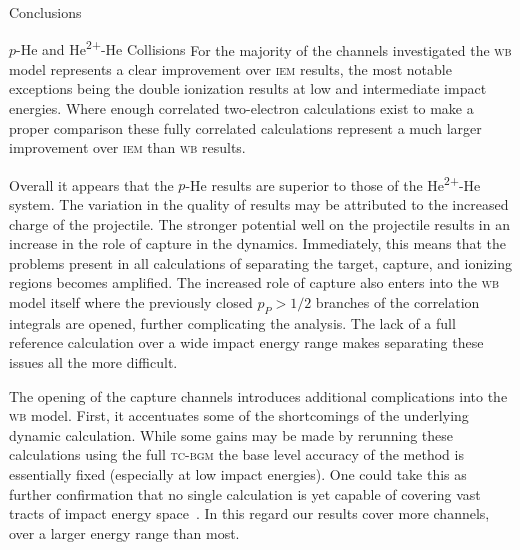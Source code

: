 \documentclass[a5paper, 9 pt]{extreport}
\begin{document}
\begin{chapter}{Conclusions \label{chap:con}}
\begin{section}{\texorpdfstring{$p$}{p}-He and \texorpdfstring{He\textsuperscript{2+}}{He2+}-He
                   Collisions \label{sec:con-phe2p-he}}
      For the majority of the channels investigated the \textsc{wb} model represents a clear improvement
      over \textsc{iem}  results, the most notable exceptions being the double ionization results at low
      and intermediate impact energies. Where enough correlated two-electron calculations exist to make
      a proper comparison these fully correlated calculations represent a much larger improvement over
      \textsc{iem} than \textsc{wb} results.

      Overall it appears that the $p$-He results are superior to those of the He\textsuperscript{2+}-He
      system. The variation in the quality of results may be attributed to the increased charge of the
      projectile. The stronger potential well on the projectile results in an increase in the role of
      capture in the dynamics. Immediately, this means that the problems present in all calculations of
      separating the target, capture, and ionizing regions becomes amplified. The increased role of
      capture also enters into the \textsc{wb} model itself where the previously closed $p_P > 1/2$
      branches of the correlation integrals are opened, further complicating the analysis. The lack of a
      full reference calculation over a wide impact energy range makes separating these issues all the
      more difficult.

      The opening of the capture channels introduces additional complications into the \textsc{wb}
      model. First, it accentuates some of the shortcomings of the underlying dynamic calculation.
      While some gains may be made by rerunning these calculations using the full \textsc{tc-bgm} the
      base level accuracy of the method is essentially fixed (especially at low impact energies). One
      could take this as further confirmation that no single calculation is yet capable of covering vast
      tracts of impact energy space~\cite{LRV-14}. In this regard our results cover more channels, over
      a larger energy range than most.


\end{section}
\end{chapter}
\end{document}
